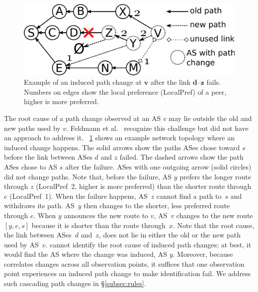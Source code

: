 \begin{figure}[t]
\centering\includegraphics[width=\columnwidth]{figs/induced2.pdf}
\vspace{-2em}
\caption{Example of an induced path change at $\boldsymbol{v}$ after the
link $\boldsymbol{d}$--$\boldsymbol{z}$ fails.  Numbers on edges show
the local preference (LocalPref) of a peer, higher is more preferred.}
\label{fig:induced1}
\end{figure}

  The root cause of a path
change observed at an AS $v$ may lie outside the old and new paths used
by $v$.  Feldmann et al.~\cite{feldman} recognize this challenge but did not have 
an approach to address it.  \fig~\ref{fig:induced1} shows an example network topology where
an induced change happens.  The solid arrows show the paths ASes chose
toward $s$ before the link between ASes $d$ and $z$ failed.  The dashed
arrows show the path ASes chose to AS $s$ after the failure.  ASes with
one outgoing arrow (solid circles) did not change paths.
Note that, before the failure, AS $y$ prefers the longer route
through $z$ (LocalPref~2, higher is more preferred) than the shorter route through $e$
(LocalPref~1).  When the failure happens, AS~$z$ cannot find a path to~$s$
and withdraws its path.  AS~$y$ then changes to the shorter, less
preferred route through $e$.  When $y$ announces the new route to $v$,
AS~$v$ changes to the new route $[y, e, s]$ because it is shorter than
the route through~$x$.  Note that the root cause, \ie the link between
ASes~$d$ and~$z$, does not lie in either the old or the new path used by
AS~$v$.  \feldmann cannot identify the root cause of induced path
changes; at best, it would find the AS where the change was induced,
\eg AS $y$.  Moreover, because \feldmann correlates changes across all
observation points, it suffices that one observation point experiences
an induced path change to make identification fail. We address such 
cascading path changes in \S\ref{subsec:rules}.


